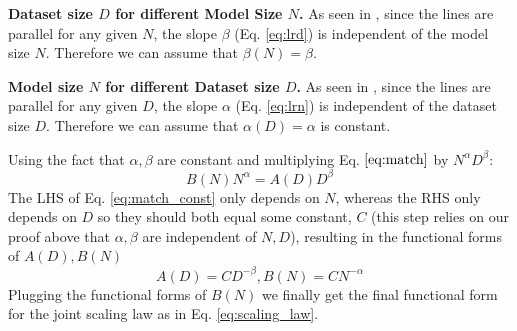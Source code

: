 \textbf{Dataset size $D$ for different Model Size $N$.} As seen in , since the lines are parallel for any given $N$, the slope $\beta$ (Eq. \ref{eq:lrd}) is independent of the model size $N$. Therefore we can assume that $\beta(N)=\beta$.

\textbf{Model size $N$ for different Dataset size $D$.} As seen in , since the lines are parallel for any given $D$, the slope $\alpha$ (Eq. \ref{eq:lrn}) is independent of the dataset size $D$. Therefore we can assume that $\alpha(D)=\alpha$ is constant.

Using the fact that $\alpha,\beta$ are constant and multiplying Eq. $\ref{eq:match}$ by $N^{\alpha} D^{\beta}$:
\begin{equation}\label{eq:match_const}
    B(N) N^{\alpha} =A(D) D^{\beta}
\end{equation}
The LHS of Eq. \ref{eq:match_const} only depends on $N$, whereas the RHS only depends on $D$ so they should both equal some constant, $C$ (this step relies on our proof above that $\alpha,\beta$ are independent of $N,D$), resulting in the functional forms of $A(D),B(N)$
\begin{equation}\label{eq:AB}
   A(D) = CD^{-\beta}, B(N)=CN^{-\alpha}
\end{equation}
Plugging the functional forms of $B(N)$ we finally get the final functional form for the joint scaling law as in Eq. \ref{eq:scaling_law}.

